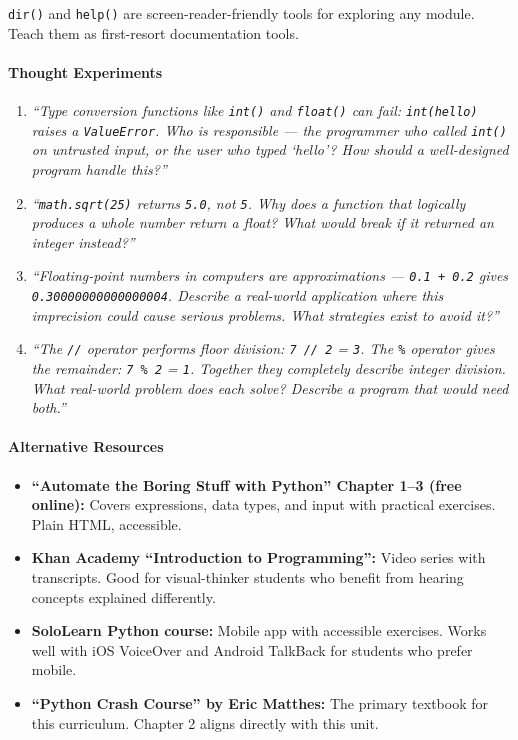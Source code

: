 \documentclass[
  justified,
  openright,
]{tufte-book}
\let\paragraph\paragraph
\let\paragraph\paragraph
\providecommand{\tightlist}{%
  \setlength{\itemsep}{0pt}\setlength{\parskip}{0pt}}
\begin{document}
\texttt{dir()} and \texttt{help()} are screen-reader-friendly tools for
exploring any module. Teach them as first-resort documentation tools.

\paragraph{Thought Experiments}\label{thought-experiments-8}

\begin{enumerate}
\def\labelenumi{\arabic{enumi}.}
\item
  \emph{``Type conversion functions like \texttt{int()} and
  \texttt{float()} can fail:
  \texttt{int(\textquotesingle{}hello\textquotesingle{})} raises a
  \texttt{ValueError}. Who is responsible --- the programmer who called
  \texttt{int()} on untrusted input, or the user who typed `hello'? How
  should a well-designed program handle this?''}
\item
  \emph{``\texttt{math.sqrt(25)} returns \texttt{5.0}, not \texttt{5}.
  Why does a function that logically produces a whole number return a
  float? What would break if it returned an integer instead?''}
\item
  \emph{``Floating-point numbers in computers are approximations ---
  \texttt{0.1\ +\ 0.2} gives \texttt{0.30000000000000004}. Describe a
  real-world application where this imprecision could cause serious
  problems. What strategies exist to avoid it?''}
\item
  \emph{``The \texttt{//} operator performs floor division:
  \texttt{7\ //\ 2} = \texttt{3}. The \texttt{\%} operator gives the
  remainder: \texttt{7\ \%\ 2} = \texttt{1}. Together they completely
  describe integer division. What real-world problem does each solve?
  Describe a program that would need both.''}
\end{enumerate}

\paragraph{Alternative Resources}\label{alternative-resources-1}

\begin{itemize}
\tightlist
\item
  \textbf{``Automate the Boring Stuff with Python'' Chapter 1--3 (free
  online):} Covers expressions, data types, and input with practical
  exercises. Plain HTML, accessible.
\item
  \textbf{Khan Academy ``Introduction to Programming'':} Video series
  with transcripts. Good for visual-thinker students who benefit from
  hearing concepts explained differently.
\item
  \textbf{SoloLearn Python course:} Mobile app with accessible
  exercises. Works well with iOS VoiceOver and Android TalkBack for
  students who prefer mobile.
\item
  \textbf{``Python Crash Course'' by Eric Matthes:} The primary textbook
  for this curriculum. Chapter 2 aligns directly with this unit.
\end{itemize}
\end{document}
